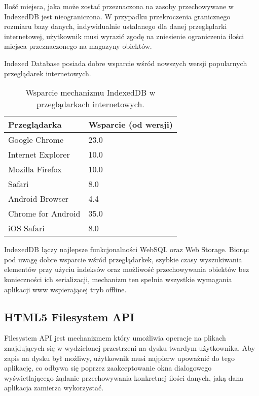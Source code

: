 Ilość miejsca, jaka może zostać przeznaczona na zasoby przechowywane w IndexedDB jest nieograniczona. W przypadku przekroczenia granicznego rozmiaru bazy danych, indywidualnie ustalanego dla danej przeglądarki internetowej, użytkownik musi wyrazić zgodę na zniesienie ograniczenia ilości miejsca przeznaczonego na magazyny obiektów.

Indexed Database posiada dobre wsparcie wśród nowszych wersji popularnych przeglądarek internetowych.

\begin{table}[h]
\centering
    \begin{tabular}{ | p{8cm} | p{6cm} | }
    \hline
    \textbf{Przeglądarka} & \textbf{Wsparcie (od wersji)} \\ \hline
	Google Chrome & 23.0
	\\ \hline
	Internet Explorer & 10.0
	\\ \hline
	Mozilla Firefox & 10.0
	\\ \hline
	Safari & 8.0
	\\ \hline
	Android Browser & 4.4
	\\ \hline
	Chrome for Android & 35.0
	\\ \hline
	iOS Safari & 8.0
	\\ \hline
    \end{tabular}
	\caption{Wsparcie mechanizmu IndexedDB w przeglądarkach internetowych.}
\end{table}

IndexedDB łączy najlepsze funkcjonalności WebSQL oraz Web Storage. Biorąc pod uwagę dobre wsparcie wśród przeglądarkek, szybkie czasy wyszukiwania elementów przy użyciu indeksów oraz możliwość przechowywania obiektów bez konieczności ich serializacji, mechanizm ten spełnia wszystkie wymagania aplikacji www wspierającej tryb offline.

\subsection{HTML5 Filesystem API}
\label{sec:html5filesystemApi}

Filesystem API\cite{filesystemApi} jest mechanizmem który umożliwia operacje na plikach znajdujących się w wydzielonej przestrzeni na dysku twardym użytkownika. Aby zapis na dysku był możliwy, użytkownik musi najpierw upoważnić do tego aplikację, co odbywa się poprzez zaakceptowanie okna dialogowego wyświetlającego żądanie przechowywania konkretnej ilości danych, jaką dana aplikacja zamierza wykorzystać.

